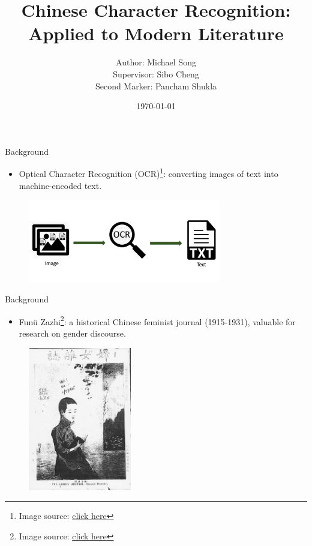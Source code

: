 \documentclass{beamer}
\title{Chinese Character Recognition:\\Applied to Modern Literature}
\author{Author: Michael Song\\Supervisor: Sibo Cheng\\Second Marker: Pancham Shukla}
\institute{Imperial College London}
\date{\today}
\begin{document}
\begin{frame}
    \titlepage
\end{frame}

\begin{frame}
    \begin{center}
        \Large{Background}
    \end{center}
    \begin{itemize}
        \item Optical Character Recognition (OCR)\footnote{Image source: \href{https://www.edenai.co/post/analyze-easily-document-files-with-ai-optical-character-recognition-ocr}{click here}}: converting images of text into machine-encoded text.
    \end{itemize}
    \begin{figure}
        \centering
        \includegraphics[width=0.75\textwidth]{figures/ocr.png}
    \end{figure}
\end{frame}

\begin{frame}
    \begin{center}
        \Large{Background}
    \end{center}
    \begin{itemize}
        \item Funü Zazhi\footnote{Image source: \href{https://mhdb.mh.sinica.edu.tw/fnzz/image.php?book=1501&page=1}{click here}}: a historical Chinese feminist journal (1915-1931), valuable for research on gender discourse.
    \end{itemize}
    \begin{figure}
        \centering
        \includegraphics[width=0.4\textwidth]{figures/fnzz.jpg}
    \end{figure}
\end{frame}
\end{document}
